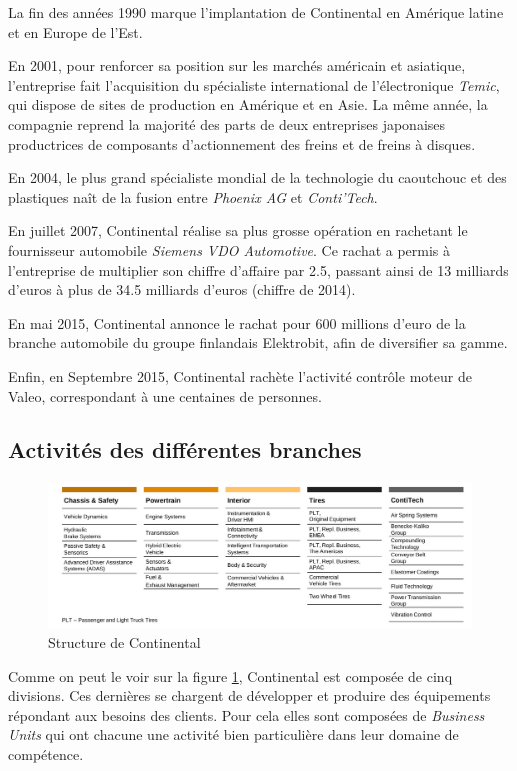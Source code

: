La fin des années 1990 marque l'implantation de Continental en Amérique latine et en Europe de l'Est.

En 2001, pour renforcer sa position sur les marchés américain et asiatique, l'entreprise fait l'acquisition du spécialiste international de l'électronique \textit{Temic}, qui dispose de sites de production en Amérique et en Asie. La même année, la compagnie reprend la majorité des parts de deux entreprises japonaises productrices de composants d'actionnement des freins et de freins à disques. 

En 2004, le plus grand spécialiste mondial de la technologie du caoutchouc et des plastiques naît de la fusion entre \textit{Phoenix AG} et \textit{Conti'Tech}.

En juillet 2007, Continental réalise sa plus grosse opération en rachetant le fournisseur automobile \textit{Siemens VDO Automotive}. Ce rachat a permis à l'entreprise de multiplier son chiffre d'affaire par 2.5, passant ainsi de 13 milliards d'euros à plus de 34.5 milliards d'euros (chiffre de 2014).

En mai 2015, Continental annonce le rachat pour 600 millions d'euro de la branche automobile du groupe finlandais Elektrobit, afin de diversifier sa gamme.

Enfin, en Septembre 2015, Continental rachète l'activité contrôle moteur de Valeo, correspondant à une centaines de personnes.

\subsection{Activités des différentes branches}
\begin{figure}[H]
	\hspace{-40px}
	\includegraphics[width=20cm]{contents/images/structureConti.jpg}
	\caption{Structure de Continental}
	\label{fig:structConti}
\end{figure}

Comme on peut le voir sur la figure \ref{fig:structConti}, Continental est composée de cinq divisions. Ces dernières se chargent de développer et produire des équipements répondant aux besoins des clients. Pour cela elles sont composées de \textit{Business Units} qui ont chacune une activité bien particulière dans leur domaine de compétence. 

